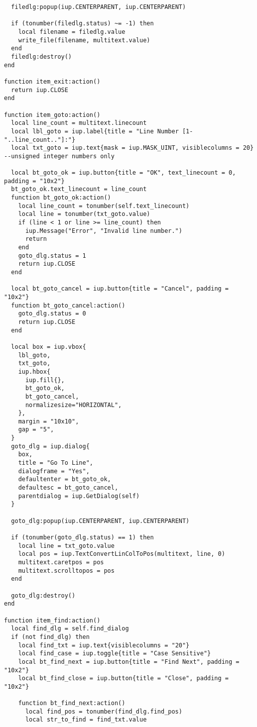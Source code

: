 \documentclass{ctexart}
\begin{document}
\begin{lstlisting}
  filedlg:popup(iup.CENTERPARENT, iup.CENTERPARENT)

  if (tonumber(filedlg.status) ~= -1) then
    local filename = filedlg.value
    write_file(filename, multitext.value)
  end
  filedlg:destroy()
end

function item_exit:action()
  return iup.CLOSE
end

function item_goto:action()
  local line_count = multitext.linecount
  local lbl_goto = iup.label{title = "Line Number [1-"..line_count.."]:"}
  local txt_goto = iup.text{mask = iup.MASK_UINT, visiblecolumns = 20} --unsigned integer numbers only

  local bt_goto_ok = iup.button{title = "OK", text_linecount = 0, padding = "10x2"} 
  bt_goto_ok.text_linecount = line_count
  function bt_goto_ok:action()
    local line_count = tonumber(self.text_linecount)
    local line = tonumber(txt_goto.value)
    if (line < 1 or line >= line_count) then
      iup.Message("Error", "Invalid line number.")
      return
    end
    goto_dlg.status = 1
    return iup.CLOSE
  end

  local bt_goto_cancel = iup.button{title = "Cancel", padding = "10x2"}
  function bt_goto_cancel:action()
    goto_dlg.status = 0
    return iup.CLOSE
  end

  local box = iup.vbox{
    lbl_goto,
    txt_goto,
    iup.hbox{
      iup.fill{},
      bt_goto_ok,
      bt_goto_cancel,
      normalizesize="HORIZONTAL", 
    },
    margin = "10x10", 
    gap = "5",
  }
  goto_dlg = iup.dialog{
    box,
    title = "Go To Line", 
    dialogframe = "Yes", 
    defaultenter = bt_goto_ok, 
    defaultesc = bt_goto_cancel,
    parentdialog = iup.GetDialog(self)
  }

  goto_dlg:popup(iup.CENTERPARENT, iup.CENTERPARENT)

  if (tonumber(goto_dlg.status) == 1) then
    local line = txt_goto.value
    local pos = iup.TextConvertLinColToPos(multitext, line, 0)
    multitext.caretpos = pos
    multitext.scrolltopos = pos
  end

  goto_dlg:destroy()
end

function item_find:action()
  local find_dlg = self.find_dialog
  if (not find_dlg) then
    local find_txt = iup.text{visiblecolumns = "20"}
    local find_case = iup.toggle{title = "Case Sensitive"}
    local bt_find_next = iup.button{title = "Find Next", padding = "10x2"}
    local bt_find_close = iup.button{title = "Close", padding = "10x2"}

    function bt_find_next:action()
      local find_pos = tonumber(find_dlg.find_pos)
      local str_to_find = find_txt.value


\end{lstlisting}
\end{document}
